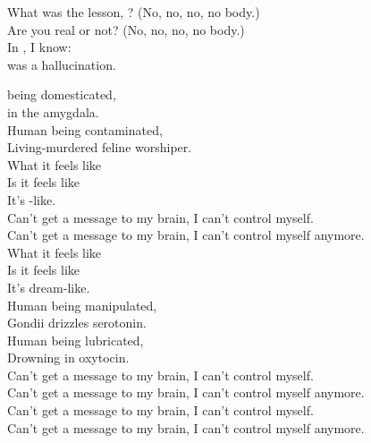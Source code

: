 What was the lesson, ? (No, no, no, no body.) \\
Are you real or not? (No, no, no, no body.) \\

In , I know: \\
 was a hallucination. \\





 being domesticated, \\
 in the amygdala. \\
Human being contaminated, \\
Living-murdered feline worshiper. \\

What it feels like \\
Is it feels like \\
It's -like. \\

Can't get a message to my brain, I can't control myself. \\
Can't get a message to my brain, I can't control myself anymore. \\

What it feels like \\
Is it feels like \\
It's dream-like. \\

Human being manipulated, \\
Gondii drizzles serotonin. \\
Human being lubricated, \\
Drowning in oxytocin. \\

Can't get a message to my brain, I can't control myself. \\
Can't get a message to my brain, I can't control myself anymore. \\
Can't get a message to my brain, I can't control myself. \\
Can't get a message to my brain, I can't control myself anymore. \\

